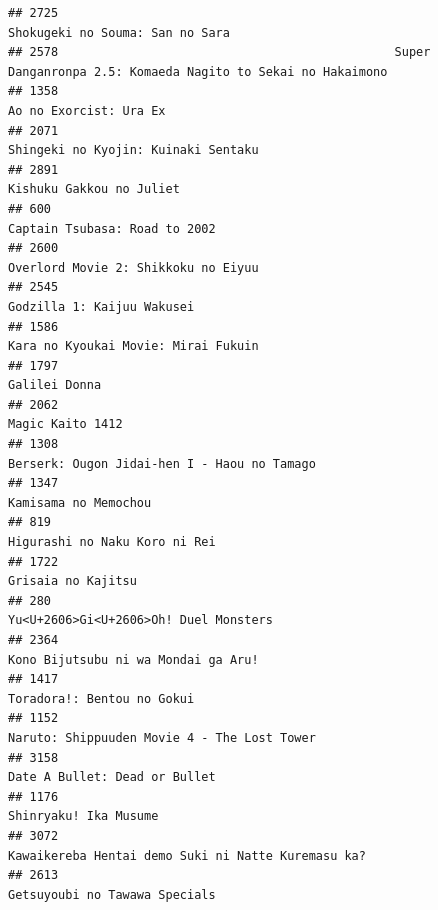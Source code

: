 \documentclass[
]{article}
\begin{document}
\begin{verbatim}
## 2725                                                                           Shokugeki no Souma: San no Sara
## 2578                                               Super Danganronpa 2.5: Komaeda Nagito to Sekai no Hakaimono
## 1358                                                                                    Ao no Exorcist: Ura Ex
## 2071                                                                       Shingeki no Kyojin: Kuinaki Sentaku
## 2891                                                                                  Kishuku Gakkou no Juliet
## 600                                                                              Captain Tsubasa: Road to 2002
## 2600                                                                       Overlord Movie 2: Shikkoku no Eiyuu
## 2545                                                                                Godzilla 1: Kaijuu Wakusei
## 1586                                                                       Kara no Kyoukai Movie: Mirai Fukuin
## 1797                                                                                             Galilei Donna
## 2062                                                                                          Magic Kaito 1412
## 1308                                                               Berserk: Ougon Jidai-hen I - Haou no Tamago
## 1347                                                                                      Kamisama no Memochou
## 819                                                                              Higurashi no Naku Koro ni Rei
## 1722                                                                                        Grisaia no Kajitsu
## 280                                                                      Yu<U+2606>Gi<U+2606>Oh! Duel Monsters
## 2364                                                                       Kono Bijutsubu ni wa Mondai ga Aru!
## 1417                                                                                Toradora!: Bentou no Gokui
## 1152                                                               Naruto: Shippuuden Movie 4 - The Lost Tower
## 3158                                                                             Date A Bullet: Dead or Bullet
## 1176                                                                                     Shinryaku! Ika Musume
## 3072                                                        Kawaikereba Hentai demo Suki ni Natte Kuremasu ka?
## 2613                                                                             Getsuyoubi no Tawawa Specials

\end{verbatim}
\end{document}
